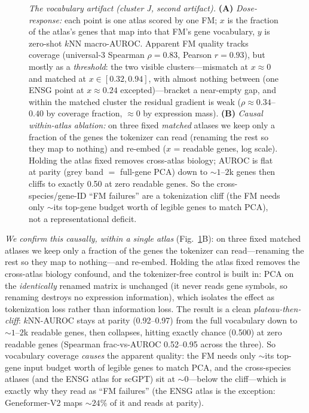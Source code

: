\documentclass[fleqn,10pt,lineno]{wlpeerj}  %
\newcommand{\fitfig}[1]{\resizebox{\ifdim\width>\linewidth\linewidth\else\width\fi}{!}{#1}}
\begin{document}
\begin{figure}[!ht]\centering\fitfig{}
\caption{\emph{The vocabulary artifact (cluster J, second artifact).} \textbf{(A)} \emph{Dose-response:} each point is one atlas scored by one FM; $x$ is the fraction of the atlas's genes that map into that FM's gene vocabulary, $y$ is zero-shot $k$NN macro-AUROC. Apparent FM quality tracks coverage (universal-3 Spearman $\rho=0.83$, Pearson $r=0.93$), but mostly as a \emph{threshold}: the two visible clusters---mismatch at $x\!\approx\!0$ and matched at $x\!\in\![0.32,0.94]$, with almost nothing between (one ENSG point at $x\!\approx\!0.24$ excepted)---bracket a near-empty gap, and within the matched cluster the residual gradient is weak ($\rho\approx0.34$--$0.40$ by coverage fraction, $\approx\!0$ by expression mass). \textbf{(B)} \emph{Causal within-atlas ablation:} on three fixed \emph{matched} atlases we keep only a fraction of the genes the tokenizer can read (renaming the rest so they map to nothing) and re-embed ($x$ = readable genes, log scale). Holding the atlas fixed removes cross-atlas biology; AUROC is flat at parity (grey band $=$ full-gene PCA) down to ${\sim}1$--$2$k genes then cliffs to exactly 0.50 at zero readable genes. So the cross-species/gene-ID ``FM failures'' are a tokenization cliff (the FM needs only ${\sim}$its top-gene budget worth of legible genes to match PCA), not a representational deficit.}\label{fig:vocab}\end{figure}

\emph{We confirm this causally, within a single atlas} (Fig.~\ref{fig:vocab}B): on three fixed matched atlases we keep only a fraction of the genes the tokenizer can read---renaming the rest so they map to nothing---and re-embed. Holding the atlas fixed removes the cross-atlas biology confound, and the tokenizer-free control is built in: PCA on the \emph{identically} renamed matrix is unchanged (it never reads gene symbols, so renaming destroys no expression information), which isolates the effect as tokenization loss rather than information loss. The result is a clean \emph{plateau-then-cliff}: $k$NN-AUROC stays at parity (0.92--0.97) from the full vocabulary down to ${\sim}1$--$2$k readable genes, then collapses, hitting exactly chance (0.500) at zero readable genes (Spearman frac-vs-AUROC 0.52--0.95 across the three). So vocabulary coverage \emph{causes} the apparent quality: the FM needs only ${\sim}$its top-gene input budget worth of legible genes to match PCA, and the cross-species atlases (and the ENSG atlas for scGPT) sit at ${\sim}0$---below the cliff---which is exactly why they read as ``FM failures'' (the ENSG atlas is the exception: Geneformer-V2 maps ${\sim}24\%$ of it and reads at parity).
\end{document}
